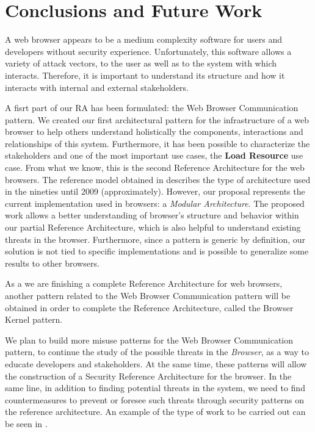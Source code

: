 \documentclass[prodmode,acmtecs]{acmsmall}
\begin{document}
\section{Conclusions and Future Work}
A web browser appears to be a medium complexity software for users and developers without security experience. Unfortunately, this software allows a variety of attack vectors, to the user as well as to the system with which interacts. Therefore, it is important to understand its structure and how it interacts with internal and external stakeholders.

A fisrt part of our RA has been formulated: the Web Browser Communication pattern. We created our first architectural pattern for the infrastructure of a web browser to help others understand holistically the components, interactions and relationships of this system. Furthermore, it has been possible to characterize the stakeholders and one of the most important use cases, the \textbf{Load Resource} use case. From what we know, this is the second Reference Architecture for the web browsers. The reference model obtained in \cite{2005-grosskurth-browser-refarch} describes the type of architecture used in the nineties until 2009 (approximately). However, our proposal represents the current implementation used in browsers: a \textit{Modular Architecture}. The proposed work allows a better understanding of browser's structure and behavior within our partial Reference Architecture, which is also helpful to understand existing threats in the browser. Furthermore, since a pattern is generic by definition, our solution is not tied to specific implementations and is possible to generalize some results to other browsers. 

As a we are finishing a complete Reference Architecture for web browsers, another pattern related to the Web Browser Communication pattern will be obtained in order to complete the Reference Architecture, called the Browser Kernel pattern. 

We plan to build more \cite{silva2015b} misuse patterns for the Web Browser Communication pattern, to continue the study of the possible threats in the \textit{Browser}, as a way to educate developers and stakeholders. At the same time, these patterns will allow the construction of a Security Reference Architecture for the browser. In the same line, in addition to finding potential threats in the system, we need to find countermeasures to prevent or foresee such threats through security patterns on the reference architecture. An example of the type of work to be carried out can be seen in \cite{Fernandez2016}.
\end{document}

